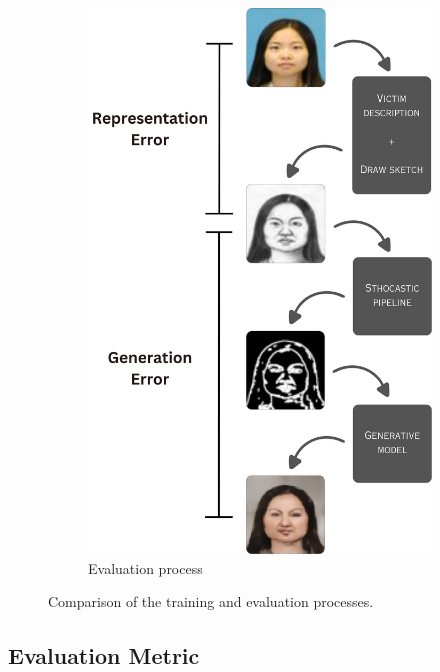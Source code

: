 \documentclass{IEEEcsmag}
\begin{document}
\begin{figure}[ht]
\begin{subfigure}{0.36\textwidth}
        \includegraphics[width=0.95\linewidth]{example image/validationFramework.png}
        \caption{Evaluation process}
        \label{fig:evaluationProcess}
    \end{subfigure}
    \caption{Comparison of the training and evaluation processes.}
    \label{fig:trainingEvaluationComparison}
\end{figure}


\subsection{Evaluation Metric}
\label{subsec:evaluation}
\end{document}
